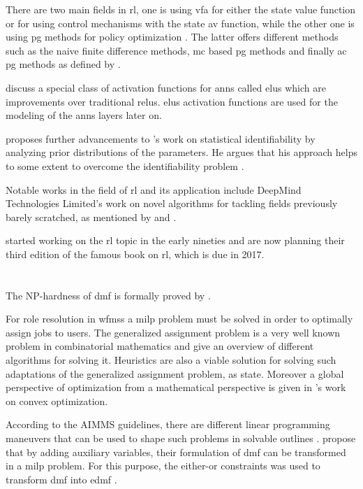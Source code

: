 There are two main fields in \gls{rl}, one is using \gls{vfa} for either the state value function or for using control mechanisms with the state \gls{av} function, while the other one is using \gls{pg} methods for policy optimization \citep{Sutton2017}. The latter offers different methods such as the naive finite difference methods, \gls{mc} based \gls{pg} methods and finally \gls{ac} \gls{pg} methods as defined by \citet{Silver2014}.

\citet{Clevert2015} discuss a special class of activation functions for \glspl{ann} called \glspl{elu} which are improvements over traditional \glspl{relu}. \glspl{elu} activation functions are used for the modeling of the \glspl{ann} layers later on.

\citet{Gershman2016} proposes further advancements to \citet{Zhang2011}'s work on statistical identifiability by analyzing prior distributions of the parameters. He argues that his approach helps to some extent to overcome the identifiability problem \citep{Gershman2016}.

Notable works in the field of \gls{rl} and its application include DeepMind Technologies Limited's work on novel algorithms for tackling fields previously barely scratched, as mentioned by \citet{Mnih2015} and \citet{Silver2016}.

\citet{Sutton2017} started working on the \gls{rl} topic in the early nineties and are now planning their third edition of the famous book on \gls{rl}, which is due in 2017.

\section{}
\label{sec:milp}

The NP-hardness of \gls{dmf} is formally proved by \citet{Garey1990}.

For role resolution in \glspl{wfms} a \gls{milp} problem must be solved in order to optimally assign jobs to users. The generalized assignment problem is a very well known problem in combinatorial mathematics and \citet{Cattrysse1992} give an overview of different algorithms for solving it. Heuristics are also a viable solution for solving such adaptations of the generalized assignment problem, as \citet{Racer1994} state. Moreover a global perspective of optimization from a mathematical perspective is given in \citet{Boyd2004}'s work on convex optimization.

According to the AIMMS guidelines, there are different linear programming maneuvers that can be used to shape such problems in solvable outlines \citep{Bisschop2016}. \citet{Zeng2005} propose that by adding auxiliary variables, their formulation of \gls{dmf} can be transformed in a \gls{milp} problem. For this purpose, the either-or constraints was used to transform \gls{dmf} into \gls{edmf} \citep[p. 77]{Bisschop2016}.

